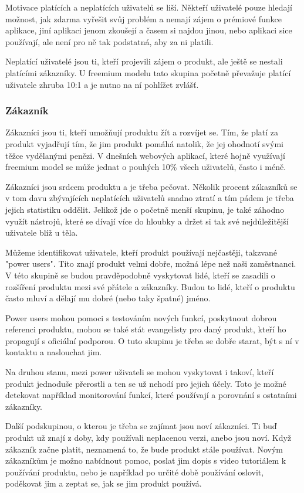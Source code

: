 \documentclass[bc,male,java,dept456]{diploma}						%
\begin{document}
Motivace platících a neplatících uživatelů se liší. Někteří uživatelé pouze hledají mo\-žnost, jak zdarma vyřešit svůj problém a nemají zájem o prémiové funkce aplikace, jiní aplikaci jenom zkoušejí a časem si najdou jinou, nebo aplikaci sice používají, ale není pro ně tak podstatná, aby za ni platili.

Neplatící uživatelé jsou ti, kteří projevili zájem o produkt, ale ještě se nestali platícími zákazníky. U freemium modelu tato skupina početně převažuje platící uživatele zhruba 10:1 a je nutno na ní pohlížet zvlášť.

\subsubsection{Zákazník}

Zákazníci jsou ti, kteří umožňují produktu žít a rozvíjet se. Tím, že platí za produkt vyjadřují tím, že jim produkt pomáhá natolik, že jej ohodnotí svými těžce vydělanými penězi. V dnešních webových aplikací, které hojně využívají freemium model se může jednat o pouhých 10\% všech uživatelů, často i méně. 

Zákazníci jsou srdcem produktu a je třeba pečovat. Několik procent zákazníků se v tom davu zbývajících neplatících uživatelů snadno ztratí a tím pádem je třeba jejich statistiku oddělit. Jelikož jde o početně menší skupinu, je také záhodno využít nástrojů, které se dívají více do hloubky a držet si tak své nejdůležitější uživatele blíž u těla. 

Můžeme identifikovat uživatele, kteří produkt používají nejčastěji, takzvané "power users". Tito znají produkt velmi dobře, možná lépe než naši zaměstnanci. V této skupině se budou pravděpodobně vyskytovat lidé, kteří se zasadili o rozšíření produktu mezi své přátele a zákazníky. Budou to lidé, kteří o produktu často mluví a dělají mu dobré (nebo taky špatné) jméno.

Power users mohou pomoci s testováním nových funkcí, poskytnout dobrou referenci produktu, mohou se také stát evangelisty pro daný produkt, kteří ho propagují s oficiální podporou. O tuto skupinu je třeba se dobře starat, být s ní v kontaktu a naslouchat jim. 

Na druhou stanu, mezi power uživateli se mohou vyskytovat i takoví, kteří produkt jednoduše přerostli a ten se už nehodí pro jejich účely. Toto je možné detekovat například monitorování funkcí, které používají a porovnání s ostatními zákazníky.

Další podskupinou, o kterou je třeba se zajímat jsou noví zákazníci. Ti buď produkt už znají z doby, kdy používali neplacenou verzi, anebo jsou noví. Když zákazník začne platit, neznamená to, že bude produkt stále používat. Novým zákazníkům je možno nabídnout pomoc, poslat jim dopis s video tutoriálem k používání produktu, nebo je například po určité době používání oslovit, poděkovat jim a zeptat se, jak se jim produkt používá.
\end{document}
